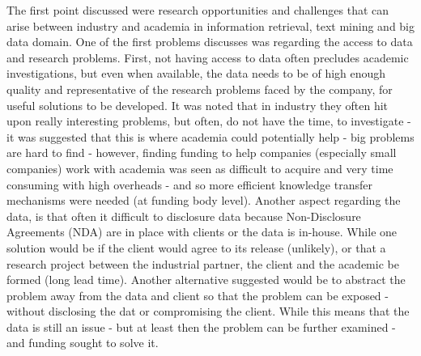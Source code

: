 The first point discussed were research opportunities and challenges that can arise between industry and academia in information retrieval, text mining and big data domain. One of the first problems discusses was regarding the access to data and research problems. First, not having access to data often precludes academic investigations,  but even when available, the data needs to be of high enough quality and representative of the research problems faced by the company, for useful solutions to be developed. It was noted that in industry they often hit upon really interesting problems, but often, do not have the time, to investigate - it was suggested that this is where academia could potentially help - big problems are hard to find - however, finding funding to help companies (especially small companies) work with academia was seen as difficult to acquire and very time consuming with high overheads - and so more efficient knowledge transfer mechanisms were needed (at funding body level). Another aspect regarding the data, is that often it difficult to disclosure data because Non-Disclosure Agreements (NDA) are in place with clients or the data is in-house. While one solution would be if the client would agree to its release (unlikely), or that a research project between the industrial partner, the client and the academic be formed (long lead time). Another alternative suggested would be to abstract the problem away from the data and client so that the problem can be exposed - without disclosing the dat or compromising the client. While this means that the data is still an issue - but at least then the problem can be further examined - and funding sought to solve it. 



